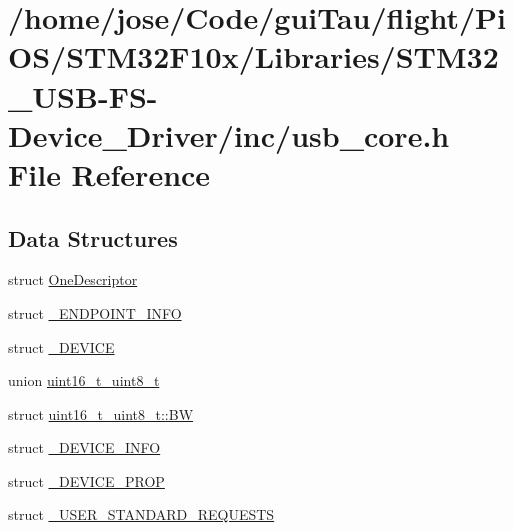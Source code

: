 \hypertarget{_s_t_m32_f10x_2_libraries_2_s_t_m32___u_s_b-_f_s-_device___driver_2inc_2usb__core_8h}{\section{/home/jose/\-Code/gui\-Tau/flight/\-Pi\-O\-S/\-S\-T\-M32\-F10x/\-Libraries/\-S\-T\-M32\-\_\-\-U\-S\-B-\/\-F\-S-\/\-Device\-\_\-\-Driver/inc/usb\-\_\-core.h File Reference}
\label{_s_t_m32_f10x_2_libraries_2_s_t_m32___u_s_b-_f_s-_device___driver_2inc_2usb__core_8h}
}
\subsection*{Data Structures}
\begin{DoxyCompactItemize}
\item 
struct \hyperlink{struct_one_descriptor}{One\-Descriptor}
\item 
struct \hyperlink{struct___e_n_d_p_o_i_n_t___i_n_f_o}{\-\_\-\-E\-N\-D\-P\-O\-I\-N\-T\-\_\-\-I\-N\-F\-O}
\item 
struct \hyperlink{struct___d_e_v_i_c_e}{\-\_\-\-D\-E\-V\-I\-C\-E}
\item 
union \hyperlink{unionuint16__t__uint8__t}{uint16\-\_\-t\-\_\-uint8\-\_\-t}
\item 
struct \hyperlink{structuint16__t__uint8__t_1_1_b_w}{uint16\-\_\-t\-\_\-uint8\-\_\-t\-::\-B\-W}
\item 
struct \hyperlink{struct___d_e_v_i_c_e___i_n_f_o}{\-\_\-\-D\-E\-V\-I\-C\-E\-\_\-\-I\-N\-F\-O}
\item 
struct \hyperlink{struct___d_e_v_i_c_e___p_r_o_p}{\-\_\-\-D\-E\-V\-I\-C\-E\-\_\-\-P\-R\-O\-P}
\item 
struct \hyperlink{struct___u_s_e_r___s_t_a_n_d_a_r_d___r_e_q_u_e_s_t_s}{\-\_\-\-U\-S\-E\-R\-\_\-\-S\-T\-A\-N\-D\-A\-R\-D\-\_\-\-R\-E\-Q\-U\-E\-S\-T\-S}
\end{DoxyCompactItemize}
